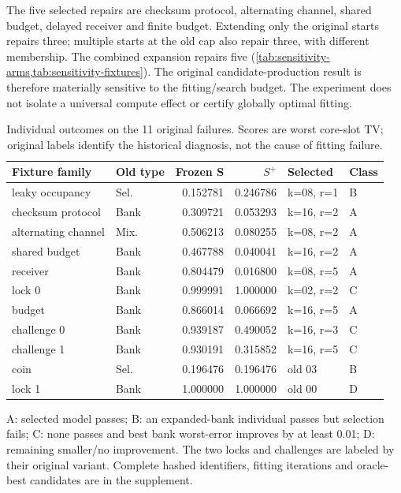 The five selected repairs are checksum protocol, alternating channel, shared budget, delayed receiver and finite budget. Extending only the original starts repairs three; multiple starts at the old cap also repair three, with different membership. The combined expansion repairs five (\cref{tab:sensitivity-arms,tab:sensitivity-fixtures}). The original candidate-production result is therefore materially sensitive to the fitting/search budget. The experiment does not isolate a universal compute effect or certify globally optimal fitting.


\begin{table}[tbp]
\centering\caption{Individual outcomes on the 11 original failures. Scores are worst core-slot TV; original labels identify the historical diagnosis, not the cause of fitting failure.}\label{tab:sensitivity-fixtures}
\small\begin{tabular}{@{}llrrll@{}}\toprule
Fixture family & Old type & Frozen S & $S^+$ & Selected & Class\\\midrule
leaky occupancy & Sel. & 0.152781 & 0.246786 & k=08, r=1 & B\\
checksum protocol & Bank & 0.309721 & 0.053293 & k=16, r=2 & A\\
alternating channel & Mix. & 0.506213 & 0.080255 & k=08, r=2 & A\\
shared budget & Bank & 0.467788 & 0.040041 & k=16, r=2 & A\\
receiver & Bank & 0.804479 & 0.016800 & k=08, r=5 & A\\
lock 0 & Bank & 0.999991 & 1.000000 & k=02, r=2 & C\\
budget & Bank & 0.866014 & 0.066692 & k=16, r=5 & A\\
challenge 0 & Bank & 0.939187 & 0.490052 & k=16, r=3 & C\\
challenge 1 & Bank & 0.930191 & 0.315852 & k=16, r=5 & C\\
coin & Sel. & 0.196476 & 0.196476 & old 03 & B\\
lock 1 & Bank & 1.000000 & 1.000000 & old 00 & D\\\bottomrule
\end{tabular}
\par\smallskip\footnotesize A: selected model passes; B: an expanded-bank individual passes but selection fails; C: none passes and best bank worst-error improves by at least 0.01; D: remaining smaller/no improvement. The two locks and challenges are labeled by their original variant. Complete hashed identifiers, fitting iterations and oracle-best candidates are in the supplement.
\end{table}

